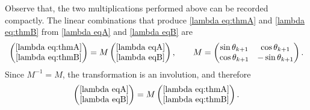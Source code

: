 \documentclass[12pt,reqno]{amsart}
\numberwithin{equation}{section}
\begin{document}
Observe that, the two multiplications performed above can be recorded compactly. The linear combinations that produce \eqref{lambda eq:thmA} and \eqref{lambda eq:thmB} from \eqref{lambda eqA} and \eqref{lambda eqB} are
\[
\begin{pmatrix} \eqref{lambda eq:thmA} \\ \eqref{lambda eq:thmB} \end{pmatrix} = M \begin{pmatrix} \eqref{lambda eqA} \\ \eqref{lambda eqB}\end{pmatrix}, \qquad M = \begin{pmatrix} \sin\theta_{k+1} & \cos\theta_{k+1} \\ \cos\theta_{k+1} & -\sin\theta_{k+1} \end{pmatrix}.
\]
Since $M^{-1} = M$, the transformation is an involution, and therefore
\[
 \begin{pmatrix} \eqref{lambda eqA} \\ \eqref{lambda eqB}\end{pmatrix}= M \begin{pmatrix} \eqref{lambda eq:thmA} \\ \eqref{lambda eq:thmB} \end{pmatrix}.
\]
\end{document}

